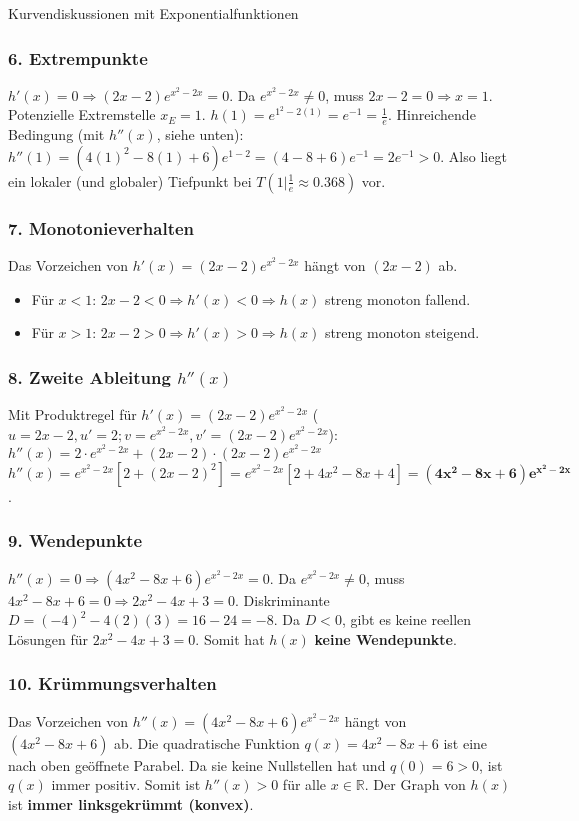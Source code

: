 \begin{loesungsumgebung}{Kurvendiskussionen mit Exponentialfunktionen}
\begin{enumerate}[label=(\alph*)]
    \subsubsection*{6. Extrempunkte}
    $h'(x)=0 \Rightarrow (2x-2)e^{x^2-2x}=0$. Da $e^{x^2-2x} \neq 0$, muss $2x-2=0 \Rightarrow x=1$.
    Potenzielle Extremstelle $x_E=1$. $h(1) = e^{1^2-2(1)} = e^{-1} = \frac{1}{e}$.
    Hinreichende Bedingung (mit $h''(x)$, siehe unten): $h''(1) = (4(1)^2-8(1)+6)e^{1-2} = (4-8+6)e^{-1} = 2e^{-1} > 0$.
    Also liegt ein lokaler (und globaler) Tiefpunkt bei $T(1 | \frac{1}{e} \approx 0.368)$ vor.

    \subsubsection*{7. Monotonieverhalten}
    Das Vorzeichen von $h'(x)=(2x-2)e^{x^2-2x}$ hängt von $(2x-2)$ ab.
    \begin{itemize}
        \item Für $x < 1$: $2x-2 < 0 \Rightarrow h'(x) < 0 \Rightarrow h(x)$ streng monoton fallend.
        \item Für $x > 1$: $2x-2 > 0 \Rightarrow h'(x) > 0 \Rightarrow h(x)$ streng monoton steigend.
    \end{itemize}

    \subsubsection*{8. Zweite Ableitung $h''(x)$}
    Mit Produktregel für $h'(x)=(2x-2)e^{x^2-2x}$ ($u=2x-2, u'=2; v=e^{x^2-2x}, v'=(2x-2)e^{x^2-2x}$):
    $h''(x) = 2 \cdot e^{x^2-2x} + (2x-2) \cdot (2x-2)e^{x^2-2x}$
    $h''(x) = e^{x^2-2x} [2 + (2x-2)^2] = e^{x^2-2x} [2 + 4x^2-8x+4] = \mathbf{(4x^2-8x+6)e^{x^2-2x}}$.

    \subsubsection*{9. Wendepunkte}
    $h''(x)=0 \Rightarrow (4x^2-8x+6)e^{x^2-2x}=0$.
    Da $e^{x^2-2x} \neq 0$, muss $4x^2-8x+6=0 \Rightarrow 2x^2-4x+3=0$.
    Diskriminante $D = (-4)^2 - 4(2)(3) = 16-24 = -8$.
    Da $D<0$, gibt es keine reellen Lösungen für $2x^2-4x+3=0$.
    Somit hat $h(x)$ \textbf{keine Wendepunkte}.

    \subsubsection*{10. Krümmungsverhalten}
    Das Vorzeichen von $h''(x)=(4x^2-8x+6)e^{x^2-2x}$ hängt von $(4x^2-8x+6)$ ab.
    Die quadratische Funktion $q(x)=4x^2-8x+6$ ist eine nach oben geöffnete Parabel. Da sie keine Nullstellen hat und $q(0)=6>0$, ist $q(x)$ immer positiv.
    Somit ist $h''(x) > 0$ für alle $x \in \mathbb{R}$.
    Der Graph von $h(x)$ ist \textbf{immer linksgekrümmt (konvex)}.


\end{enumerate}
\end{loesungsumgebung}
